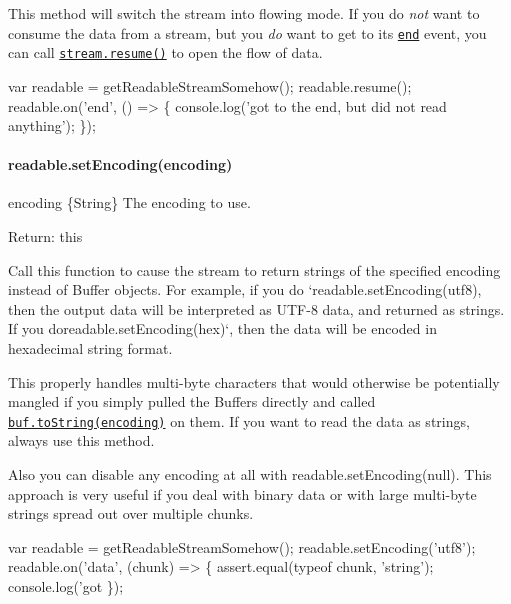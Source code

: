 This method will switch the stream into flowing mode. If you do {\itshape not} want to consume the data from a stream, but you {\itshape do} want to get to its \href{#stream_event_end}{\tt {\ttfamily \textquotesingle{}end\textquotesingle{}}} event, you can call \href{#stream_readable_resume}{\tt {\ttfamily stream.\+resume()}} to open the flow of data.


\begin{DoxyCode}
var readable = getReadableStreamSomehow();
readable.resume();
readable.on('end', () => \{
  console.log('got to the end, but did not read anything');
\});
\end{DoxyCode}


\paragraph*{readable.\+set\+Encoding(encoding)}


\begin{DoxyItemize}
\item {\ttfamily encoding} \{String\} The encoding to use.
\item Return\+: {\ttfamily this}
\end{DoxyItemize}

Call this function to cause the stream to return strings of the specified encoding instead of Buffer objects. For example, if you do `readable.set\+Encoding(\textquotesingle{}utf8\textquotesingle{}){\ttfamily , then the output data will be interpreted as U\+T\+F-\/8 data, and returned as strings. If you do}readable.\+set\+Encoding(\textquotesingle{}hex\textquotesingle{})`, then the data will be encoded in hexadecimal string format.

This properly handles multi-\/byte characters that would otherwise be potentially mangled if you simply pulled the Buffers directly and called \href{https://nodejs.org/docs/v5.8.0/api/buffer.html#buffer_buf_tostring_encoding_start_end}{\tt {\ttfamily buf.\+to\+String(encoding)}} on them. If you want to read the data as strings, always use this method.

Also you can disable any encoding at all with {\ttfamily readable.\+set\+Encoding(null)}. This approach is very useful if you deal with binary data or with large multi-\/byte strings spread out over multiple chunks.


\begin{DoxyCode}
var readable = getReadableStreamSomehow();
readable.setEncoding('utf8');
readable.on('data', (chunk) => \{
  assert.equal(typeof chunk, 'string');
  console.log('got %
\});
\end{DoxyCode}


